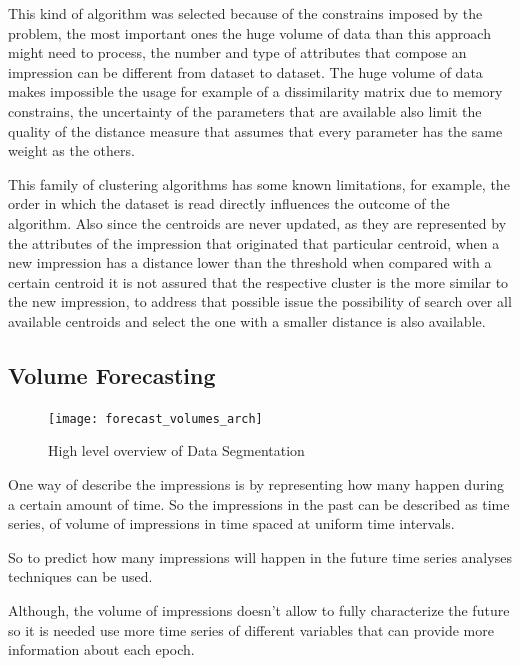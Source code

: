 This kind of algorithm was selected because of the constrains imposed by the
problem, the most important ones the huge volume of data than this approach
might need to process, the number and type of attributes that compose an
impression can be different from dataset to dataset. The huge volume of data
makes impossible the usage for example of a dissimilarity matrix due to memory
constrains, the uncertainty of the parameters that are available also limit the
quality of the distance measure that assumes that every parameter has the same
weight as the others.

This family of clustering algorithms has some known limitations, for example, the
order in which the dataset is read directly influences the outcome of the
algorithm. Also since the centroids are never updated, as they are represented
by the attributes of the impression that originated that particular centroid,
when a new impression has a distance lower than the threshold when compared with
a certain centroid it is not assured that the respective cluster is the more
similar to the new impression, to address that possible issue the possibility of
search over all available centroids and select the one with a smaller distance
is also available.

\subsection{Volume Forecasting}\label{subsec:volume_forecast}

\begin{figure}[h] \begin{center} \leavevmode
\texttt{[image: forecast\_volumes\_arch]} \caption{ High level overview
of Data Segmentation} \label{fig:forecast_volumes_arch} \end{center} \end{figure}

One way of describe the impressions is by representing how many happen during a
certain amount of time. So the impressions in the past can be described as time
series, of volume of impressions in time spaced at uniform time intervals. 

So to predict how many impressions will happen in the future time series
analyses techniques can be used. 

Although, the volume of impressions doesn't allow to fully characterize the future so
 it is needed use more time series of different variables that can provide more
 information about each epoch.

